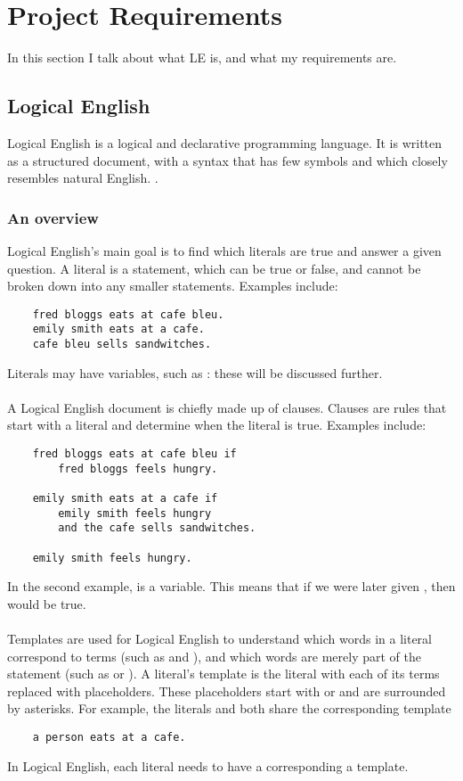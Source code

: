 \documentclass[../main.tex]{subfiles}
\begin{document}
\chapter{Project Requirements}
In this section I talk about what LE is, and what my requirements are.
\section{Logical English}
Logical English is a logical and declarative programming language. It is written as a structured document, with a syntax that has few symbols and which closely resembles natural English. \cite{logical_english}.

\subsection{An overview}
Logical English's main goal is to find which literals are true and answer a given question. A literal is a statement, which can be true or false, and cannot be broken down into any smaller statements. Examples include:
\begin{lstlisting}
    fred bloggs eats at cafe bleu.
    emily smith eats at a cafe.
    cafe bleu sells sandwitches.
\end{lstlisting}
Literals may have variables, such as : these will be discussed further.
\\ 
\\
A Logical English document is chiefly made up of clauses. Clauses are rules that start with a literal and determine when the literal is true. Examples include:
\begin{lstlisting}
    fred bloggs eats at cafe bleu if
        fred bloggs feels hungry.

    emily smith eats at a cafe if
        emily smith feels hungry
        and the cafe sells sandwitches.

    emily smith feels hungry.
\end{lstlisting}
In the second example,  is a variable. This means that if we were later given , then  would be true.
\\
\\
Templates are used for Logical English to understand which words in a literal correspond to terms (such as  and ), and which words are merely part of the statement (such as  or ). A literal's template is the literal with each of its terms replaced with placeholders. These placeholders start with  or  and are surrounded by asterisks. For example, the literals  and  both share the corresponding template
\begin{lstlisting}
    a person eats at a cafe.
\end{lstlisting} 
In Logical English, each literal needs to have a corresponding a template.
\end{document}
